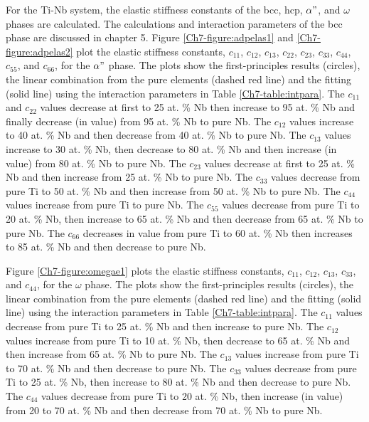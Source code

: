 For the Ti-Nb system, the elastic stiffness constants of the bcc, hcp, $\alpha"$, and $\omega$ phases are calculated. The calculations and interaction parameters of the bcc phase are discussed in chapter 5. Figure \ref{Ch7-figure:adpelas1} and \ref{Ch7-figure:adpelas2} plot the elastic stiffness constants, $c_{11}$, $c_{12}$, $c_{13}$, $c_{22}$, $c_{23}$, $c_{33}$, $c_{44}$, $c_{55}$, and $c_{66}$, for the $\alpha"$ phase. The plots show the first-principles results (circles), the linear combination from the pure elements (dashed red line) and the fitting (solid line) using the interaction parameters in Table \ref{Ch7-table:intpara}. The $c_{11}$ and $c_{22}$ values decrease at first to 25 at. \% Nb then increase to 95 at. \% Nb and finally decrease (in value) from 95 at. \% Nb to pure Nb. The $c_{12}$ values increase to 40 at. \% Nb and then decrease from 40 at. \% Nb to pure Nb. The $c_{13}$ values increase to 30 at. \% Nb, then decrease to 80 at. \% Nb and then increase (in value) from 80 at. \% Nb to pure Nb. The $c_{23}$ values decrease at first to 25 at. \% Nb and then increase from 25 at. \% Nb to pure Nb. The $c_{33}$ values decrease from pure Ti to 50 at. \% Nb and then increase from 50 at. \% Nb to pure Nb. The $c_{44}$ values increase from pure Ti to pure Nb. The $c_{55}$ values decrease from pure Ti to 20 at. \% Nb, then increase to 65 at. \% Nb and then decrease from 65 at. \% Nb to pure Nb. The $c_{66}$ decreases in value from pure Ti to 60 at. \% Nb then increases to 85 at. \% Nb and then decrease to pure Nb.

Figure \ref{Ch7-figure:omegae1} plots the elastic stiffness constants, $c_{11}$, $c_{12}$, $c_{13}$, $c_{33}$, and $c_{44}$, for the $\omega$ phase. The plots show the first-principles results (circles), the linear combination from the pure elements (dashed red line) and the fitting (solid line) using the interaction parameters in Table \ref{Ch7-table:intpara}. The $c_{11}$ values decrease from pure Ti to 25 at. \% Nb and then increase to pure Nb. The $c_{12}$ values increase from pure Ti to 10 at. \% Nb, then decrease to 65 at. \% Nb and then increase from 65 at. \% Nb to pure Nb. The $c_{13}$ values increase from pure Ti to 70 at. \% Nb and then decrease to pure Nb. The $c_{33}$ values decrease from pure Ti to 25 at. \% Nb, then increase to 80 at. \% Nb and then decrease to pure Nb. The $c_{44}$ values decrease from pure Ti to 20 at. \% Nb, then increase (in value) from 20 to 70 at. \% Nb and then decrease from 70 at. \% Nb to pure Nb.

